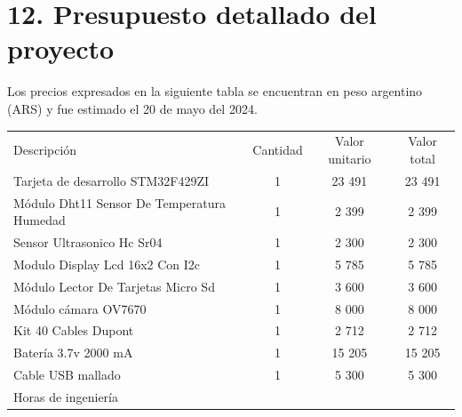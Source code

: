 \documentclass[
11pt, %
]{charter}
\begin{document}
\section{12. Presupuesto detallado del proyecto}
\label{sec:presupuesto}

Los precios expresados en la siguiente tabla se encuentran en peso argentino (ARS) y fue estimado el 20 de mayo del 2024.

\begin{table}[htpb]
\centering
\begin{tabularx}{\linewidth}{@{}|X|c|r|r|@{}}
\hline
\rowcolor[HTML]{C0C0C0} 
\multicolumn{4}{|c|}{\cellcolor[HTML]{C0C0C0}COSTOS DIRECTOS} \\ \hline
\rowcolor[HTML]{C0C0C0} 
Descripción &
  \multicolumn{1}{c|}{\cellcolor[HTML]{C0C0C0}Cantidad} &
  \multicolumn{1}{c|}{\cellcolor[HTML]{C0C0C0}Valor unitario} &
  \multicolumn{1}{c|}{\cellcolor[HTML]{C0C0C0}Valor total} 
  \\ 
  \hline Tarjeta de desarrollo STM32F429ZI
 &
  \multicolumn{1}{c|}{1} &
  \multicolumn{1}{c|}{23 491} &
  \multicolumn{1}{c|}{23 491} 
  \\ 
  \hline Módulo Dht11 Sensor De Temperatura Humedad
 &
  \multicolumn{1}{c|}{1} &
  \multicolumn{1}{c|}{2 399} &
  \multicolumn{1}{c|}{2 399} 
  \\ 
  \hline Sensor Ultrasonico Hc Sr04
 &
  \multicolumn{1}{c|}{1} &
  \multicolumn{1}{c|}{2 300} &
  \multicolumn{1}{c|}{2 300}
  \\ 
  \hline Modulo Display Lcd 16x2 Con I2c
 &
  \multicolumn{1}{c|}{1} &
  \multicolumn{1}{c|}{5 785} &
  \multicolumn{1}{c|}{5 785}
  \\ 
  \hline Módulo Lector De Tarjetas Micro Sd
 &
  \multicolumn{1}{c|}{1} &
  \multicolumn{1}{c|}{3 600} &
  \multicolumn{1}{c|}{3 600}
  \\ 
  \hline Módulo cámara OV7670
 &
  \multicolumn{1}{c|}{1} &
  \multicolumn{1}{c|}{8 000} &
  \multicolumn{1}{c|}{8 000}
  \\ 
  \hline Kit 40 Cables Dupont
 &
  \multicolumn{1}{c|}{1} &
  \multicolumn{1}{c|}{2 712} &
  \multicolumn{1}{c|}{2 712}
  \\ 
  \hline Batería 3.7v 2000 mA
 &
  \multicolumn{1}{c|}{1} &
  \multicolumn{1}{c|}{15 205} &
  \multicolumn{1}{c|}{15 205}
  \\ 
  \hline Cable USB mallado
 &
  \multicolumn{1}{c|}{1} &
  \multicolumn{1}{c|}{5 300} &
  \multicolumn{1}{c|}{5 300}
  \\ 
  \hline Horas de ingeniería
 &

\end{tabularx}
\end{table}
\end{document}
